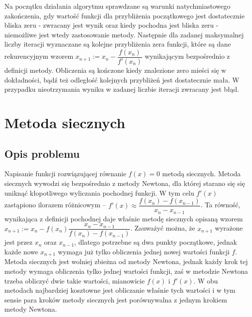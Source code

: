 \documentclass[11pt]{mk-polish-lab-report}
\begin{document}
\noindent Na początku działania algorytmu sprawdzane są warunki natychmiastowego zakończenia, gdy wartość funkcji dla przybliżenia początkowego jest dostatecznie bliska zeru - zwracany jest wynik oraz kiedy pochodna jest bliska zeru - niemożliwe jest wtedy zastosowanie metody. Następnie dla zadanej maksymalnej liczby iteracji wyznaczane są kolejne przybliżenia zera funkcji, które są dane rekurencyjnym wzorem $x_{n+1} := x_n - \dfrac{f(x_n)}{f'(x_n)}$ wynikającym bezpośrednio z definicji metody. Obliczenia są kończone kiedy znalezione zero mieści się w dokładności, bądź też odległość kolejnych przybliżeń jest dostatecznie mała. W przypadku nieotrzymania wyniku w zadanej liczbie iteracji zwracany jest błąd.

\section{Metoda siecznych}

\subsection{Opis problemu}
Napisanie funkcji rozwiązującej równanie $f(x) = 0$ metodą siecznych. Metoda siecznych wywodzi się bezpośrednio z metody Newtona, dla której starano się się uniknąć kłopotliwego wyliczania pochodnej funkcji. W tym celu $f'(x)$ zastąpiono ilorazem różnicowym -- $f'(x) \approx \dfrac{f(x_n)-f(x_{n-1})}{x_n-x_{n-1}}$. Ta równość, wynikająca z definicji pochodnej daje właśnie metodę siecznych opisaną wzorem $x_{n+1} := x_n - f(x_n)\dfrac{x_n-x_{n-1}}{f(x_n)-f(x_{n-1})}$. Zauważyć można, że $x_{n+1}$ wyrażone jest przez $x_n$ oraz $x_{n-1}$, dlatego potrzebne są dwa punkty początkowe, jednak każde nowe $x_{n+1}$ wymaga już tylko obliczenia jednej nowej wartości funkcji $f$. Metoda siecznych jest wolniej zbieżna od metody Newtona, jednak każdy krok tej metody wymaga obliczenia tylko jednej wartości funkcji, zaś w metodzie Newtona trzeba obliczyć dwie takie wartości, mianowicie $f(x)$ i $f'(x)$. W obu metodach najbardziej kosztowne jest obliczanie właśnie tych wartości i w tym sensie para kroków metody siecznych jest porównywalna z jednym krokiem metody Newtona.
\end{document}
